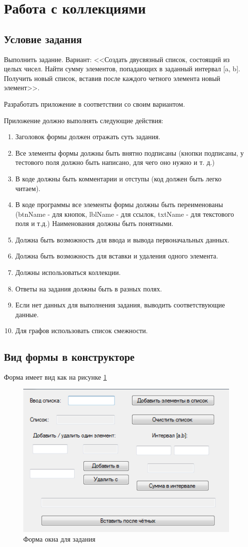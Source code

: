 \section{Работа с коллекциями}
\subsection{Условие задания}
Выполнить задание. Вариант: <<Создать двусвязный список, состоящий из целых чисел. Найти сумму элементов, попадающих в заданный интервал [a, b]. Получить новый список, вставив после каждого четного элемента новый элемент>>.

Разработать приложение в соответствии со своим вариантом.

Приложение должно выполнять следующие действия:

\begin{enumerate}
\item Заголовок формы должен отражать суть задания.
\item Все элементы формы должны быть внятно подписаны (кнопки подписаны, у тестового поля должно быть написано, для чего оно нужно и т. д.)
\item В коде должны быть комментарии и отступы (код должен быть легко читаем).
\item В коде программы все элементы формы должны быть переименованы (btnName -  для кнопок, lblName - для ссылок, txtName - для текстового поля и т.д.) Наименования должны быть понятными.
\item Должна быть возможность для ввода и вывода первоначальных данных.
\item Должна быть возможность для вставки и удаления одного элемента.
\item Должны использоваться коллекции.
\item Ответы на задания должны быть в разных полях.
\item Если нет данных для выполнения задания, выводить соответствующие данные.
\item Для графов использовать список смежности.
\end{enumerate}

\subsection{Вид формы в конструкторе}
Форма имеет вид как на рисунке \ref{fig:collections-form}

\begin{figure}
\centering
\includegraphics[width=0.5\linewidth]{images/collections/form.png}
\caption{Форма окна для задания}
\label{fig:collections-form}
\end{figure}

